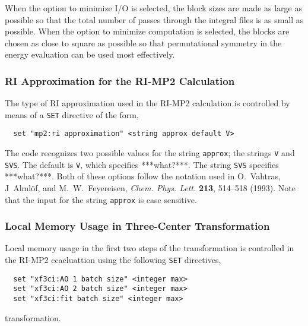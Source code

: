 When the option to minimize I/O is selected, the block sizes are made
as large as possible so that the total number of passes
through the integral files is as small as possible.  When the option to
minimize computation is selected, the blocks are chosen as close to square as
possible so that permutational symmetry in the energy evaluation can
be used most effectively.

\subsubsection{RI Approximation for the RI-MP2 Calculation}

The type of RI approximation used in the RI-MP2 calculation is controlled
by means of a \verb+SET+ directive of the form,

\begin{verbatim}
  set "mp2:ri approximation" <string approx default V>
\end{verbatim}


The code recognizes two possible values for the string \verb+approx+;
the strings \verb+V+ and \verb+SVS+.  The default is \verb+V+, which 
specifies ***what?***.  The string \verb+SVS+ specifies ***what?***.
Both of these options follow the notation used in O.~Vahtras, J~Alml\"of,
and M.~W.~Feyereisen, {\em Chem. Phys. Lett.} {\bf 213}, 514--518
(1993).  Note that the input for the string \verb+approx+ is case sensitive.



\subsubsection{Local Memory Usage in Three-Center Transformation}

Local memory usage in the first two steps of the transformation is
controlled in the RI-MP2 ccacluattion using the following \verb+SET+
directives,

\begin{verbatim}
  set "xf3ci:AO 1 batch size" <integer max>
  set "xf3ci:AO 2 batch size" <integer max>
  set "xf3ci:fit batch size" <integer max>
\end{verbatim}

transformation.  

